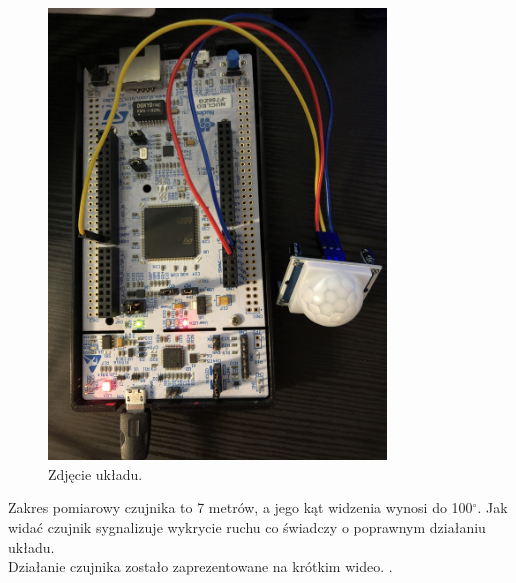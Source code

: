 \documentclass[11pt, a4paper]{article}
\begin{document}
\vspace{0.5cm}
\begin{figure}[h!]
    \centering
    \includegraphics[width=0.8\textwidth]{fig/element/uklad.jpg}
    \caption{Zdjęcie układu.}
    \label{fig:my_label}
\end{figure}

Zakres pomiarowy czujnika to 7 metrów, a jego kąt widzenia wynosi do 100$^\circ$. Jak widać czujnik sygnalizuje wykrycie ruchu co świadczy o poprawnym działaniu układu.\\

Działanie czujnika zostało zaprezentowane na krótkim wideo. \cite{youtube}.
\newpage
\printbibliography[heading=bibintoc]
\end{document}
